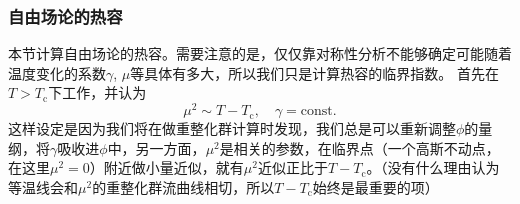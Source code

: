 \documentclass[hyperref, UTF8, a4paper]{ctexart}
\newcommand*{\const}{\mathrm{const}}
\begin{document}
\subsubsection{自由场论的热容}

本节计算自由场论的热容。需要注意的是，仅仅靠对称性分析不能够确定可能随着温度变化的系数$\gamma$, $\mu$等具体有多大，所以我们只是计算热容的临界指数。
首先在$T > T_\text{c}$下工作，并认为
\begin{equation}
    \mu^2 \sim T - T_\text{c}, \quad \gamma = \const.    
    \label{eq:mf-parameter-assumption}
\end{equation}
这样设定是因为我们将在做重整化群计算时发现，我们总是可以重新调整$\phi$的量纲，将$\gamma$吸收进$\phi$中，另一方面，$\mu^2$是相关的参数，在临界点（一个高斯不动点，在这里$\mu^2=0$）附近做小量近似，就有$\mu^2$近似正比于$T-T_\text{c}$。（没有什么理由认为等温线会和$\mu^2$的重整化群流曲线相切，所以$T-T_\text{c}$始终是最重要的项）
\end{document}

